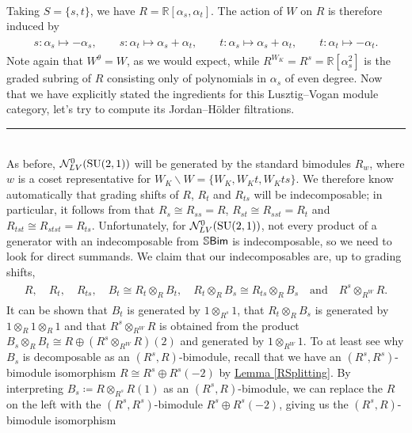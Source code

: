 \begin{example}
\begin{align*}
\begin{split}
\end{split}
\end{align*}
\noindent Taking $S = \{s, t\}$, we have $R = \mathbb{R}[\alpha_s, \alpha_t]$. The action of $W$ on $R$ is therefore induced by
\begin{align*}
\begin{split}
s : \alpha_s \mapsto -\alpha_s,\qquad s : \alpha_t \mapsto \alpha_s + \alpha_t,\qquad t : \alpha_s \mapsto \alpha_s + \alpha_t,\qquad t : \alpha_t \mapsto -\alpha_t.
\end{split}
\end{align*}
\noindent Note again that $W^\theta = W$, as we would expect, while $R^{W_K} = R^s = \mathbb{R}[\alpha_s^2]$ is the graded subring of $R$ consisting only of polynomials in $\alpha_s$ of even degree. Now that we have explicitly stated the ingredients for this Lusztig--Vogan module category, let's try to compute its Jordan--H\"{o}lder filtrations.\\[-1.5\baselineskip]
\begin{center}
\rule{0.5\linewidth}{1pt}
\end{center}
\noindent\\[-\baselineskip]
\noindent As before, $\mathcal{N}_{LV}^0(\textup{SU}(2, 1))$ will be generated by the standard bimodules $R_w$, where $w$ is a coset representative for $W_K\backslash W = \{W_K, W_Kt, W_Kts\}$. We therefore know automatically that grading shifts of $R$, $R_t$ and $R_{ts}$ will be indecomposable; in particular, it follows from \cite[Lemma 6.2.3]{LR22} that $R_s \cong R_{ss} = R$, $R_{st} \cong R_{sst} = R_t$ and $R_{tst} \cong R_{stst} = R_{ts}$. Unfortunately, for $\mathcal{N}_{LV}^0(\textup{SU}(2, 1))$, not every product of a generator with an indecomposable from $\mathbb{S}\textup{\textsf{Bim}}$ is indecomposable, so we need to look for direct summands. We claim that our indecomposables are, up to grading shifts,
\begin{align*}
\begin{split}
R,\quad R_t,\quad R_{ts},\quad B_t \cong R_t \otimes_R B_t,\quad R_t \otimes_R B_s \cong R_{ts} \otimes_R B_s\quad\text{and}\quad R^s \otimes_{R^W} R.
\end{split}
\end{align*}
\noindent It can be shown that $B_t$ is generated by $1 \otimes_{R^s} 1$, that $R_t \otimes_R B_s$ is generated by $1 \otimes_R 1 \otimes_R 1$ and that $R^s \otimes_{R^W} R$ is obtained from the product $B_s \otimes_R B_t \cong R \oplus (R^s \otimes_{R^W} R)(2)$ and generated by $1 \otimes_{R^{W}} 1$. To at least see why $B_s$ is decomposable as an $(R^s, R)$-bimodule, recall that we have an $(R^s, R^s)$-bimodule isomorphism $R \cong R^s \oplus R^s(-2)$ by \hyperref[RSplitting]{Lemma \ref*{RSplitting}}. By interpreting $B_s \coloneqq R \otimes_{R^s} R(1)$ as an $(R^s, R)$-bimodule, we can replace the $R$ on the left with the $(R^s, R^s)$-bimodule $R^s \oplus R^s(-2)$, giving us the $(R^s, R)$-bimodule isomorphism

\end{example}
